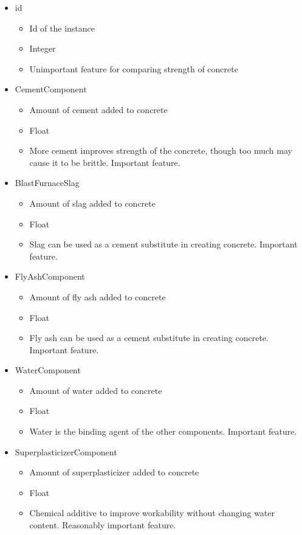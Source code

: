 \documentclass[11pt]{article}
\begin{document}
\begin{itemize}
  \item id
  \begin{itemize}
    \item Id of the instance
    \item Integer
    \item Unimportant feature for comparing strength of concrete
  \end{itemize}
  \item CementComponent
  \begin{itemize}
    \item Amount of cement added to concrete 
    \item Float
    \item More cement improves strength of the concrete, though too much may cause it to be brittle. Important feature. 
  \end{itemize}
  \item BlastFurnaceSlag
  \begin{itemize}
    \item Amount of slag added to concrete 
    \item Float
    \item Slag can be used as a cement substitute in creating concrete. Important feature. 
  \end{itemize}
  \item FlyAshComponent
  \begin{itemize}
    \item Amount of fly ash added to concrete 
    \item Float
    \item Fly ash can be used as a cement substitute in creating concrete. Important feature.
  \end{itemize}
  \item WaterComponent
  \begin{itemize}
    \item Amount of water added to concrete 
    \item Float
    \item Water is the binding agent of the other components. Important feature. 
  \end{itemize}
  \item SuperplasticizerComponent
  \begin{itemize}
    \item Amount of superplasticizer added to concrete 
    \item Float
    \item Chemical additive to improve workability without changing water content. Reasonably important feature. 

\end{itemize}
\end{itemize}
\end{document}
